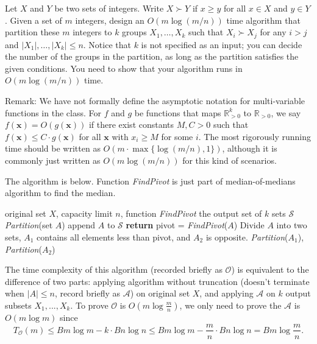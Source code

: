 \documentclass{oxmathproblems}
\begin{document}
\begin{questions}
\miquestion[25]
Let $X$ and $Y$ be two sets of integers.
Write $X\succ Y$ if $x\geq y$ for all $x\in X$ and $y\in Y$.
Given a set of $m$ integers, design an $O(m\log(m/n))$ time algorithm that partition these $m$ integers to $k$ groups $X_1,\ldots,X_k$ such that $X_i\succ X_j$ for any $i>j$ and $|X_1|,\ldots,|X_k|\leq n$.
Notice that $k$ is not specified as an input; you can decide the number of the groups in the partition, as long as the partition satisfies the given conditions.
You need to show that your algorithm runs in $O(m\log(m/n))$ time.

Remark: We have not formally define the asymptotic notation for multi-variable functions in the class.
For $f$ and $g$ be functions that maps $\mathbb{R}_{>0}^k$ to $\mathbb{R}_{>0}$, we say $f(\mathbf{x})=O(g(\mathbf{x}))$ if there exist constants $M,C>0$ such that $f(\mathbf{x})\leq C\cdot g(\mathbf{x})$ for all $\mathbf{x}$ with $x_i\geq M$ for some $i$.
The most rigorously running time should be written as $O(m\cdot\max\{\log(m/n),1\})$, although it is commonly just written as $O(m\log(m/n))$ for this kind of scenarios.

\begin{Solution}

    The algorithm is below. Function \emph{FindPivot} is just part of median-of-medians algorithm to find the median. 

    \begin{algorithm}[H]
        \renewcommand{\algorithmicensure}{\textbf{Output:}}
        \caption{}
        \begin{algorithmic}[1]
            \REQUIRE original set $X$, capacity limit $n$, function \emph{FindPivot}
            \ENSURE the output set of $k$ sets $\mathcal{S}$
            \renewcommand{\algorithmicrequire}{\textbf{function}}
            \REQUIRE \emph{Partition}(set $A$)
            \STATE append $A$ to $\mathcal{S}$
            \STATE \textbf{return}
            \ENDIF 
            \STATE pivot = \emph{FindPivot}($A$)
            \STATE Divide $A$ into two sets, $A_1$ contains all elements less than pivot, and $A_2$ is opposite.
            \STATE \emph{Partition}($A_1$), \emph{Partition}($A_2$)
            \renewcommand{\algorithmicensure}{\textbf{end function}}
            \ENSURE 
        \end{algorithmic}
    \end{algorithm}

    The time complexity of this algorithm (recorded briefly as $\mathcal{O}$) is equivalent to the difference of two parts: applying algorithm without truncation (doesn't terminate when $\lvert A \rvert \leq n$, record briefly as $\mathcal{A}$) on original set $X$, and applying $\mathcal{A}$ on $k$ output subsets $X_1,...,X_k$. To prove $\mathcal{O}$ is $O(m\log\frac{m}{n})$, we only need to prove the $\mathcal{A}$ is $O(m\log m)$ since $$T_\mathcal{O}(m)\leq  Bm\log m-k\cdot Bn\log n\leq Bm\log m-\frac{m}{n}\cdot Bn\log n=Bm\log \frac{m}{n}.$$


\end{Solution}
\end{questions}
\end{document}
